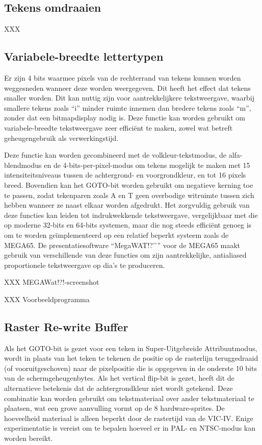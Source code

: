 \subsection{Tekens omdraaien}

XXX

\subsection{Variabele-breedte lettertypen}

Er zijn 4 bits waarmee pixels van de rechterrand van tekens kunnen worden weggesneden wanneer deze worden weergegeven. Dit heeft het effect dat tekens smaller worden. Dit kan nuttig zijn voor aantrekkelijkere tekstweergave, waarbij smallere tekens zoals ``i'' minder ruimte innemen dan bredere tekens zoals ``m'', zonder dat een bitmapdisplay nodig is. Deze functie kan worden gebruikt om variabele-breedte tekstweergave zeer efficiënt te maken, zowel wat betreft geheugengebruik als verwerkingstijd.

Deze functie kan worden gecombineerd met de volkleur-tekstmodus, de alfa-blendmodus en de 4-bits-per-pixel-modus om tekens mogelijk te maken met 15 intensiteitsniveaus tussen de achtergrond- en voorgrondkleur, en tot 16 pixels breed. Bovendien kan het GOTO-bit worden gebruikt om negatieve kerning toe te passen, zodat tekenparen zoals A en T geen overbodige witruimte tussen zich hebben wanneer ze naast elkaar worden afgedrukt. Het zorgvuldig gebruik van deze functies kan leiden tot indrukwekkende tekstweergave, vergelijkbaar met die op moderne 32-bits en 64-bits systemen, maar die nog steeds efficiënt genoeg is om te worden geïmplementeerd op een relatief beperkt systeem zoals de MEGA65. De presentatiesoftware ``MegaWAT!?’’'' voor de MEGA65 maakt gebruik van verschillende van deze functies om zijn aantrekkelijke, antialiased proportionele tekstweergave op dia's te produceren.

XXX MEGAWat!?!-screenshot

XXX Voorbeeldprogramma

\subsection{Raster Re-write Buffer}

Als het GOTO-bit is gezet voor een teken in Super-Uitgebreide Attribuutmodus, wordt in plaats van het teken te tekenen de positie op de rasterlijn teruggedraaid (of vooruitgeschoven) naar de pixelpositie die is opgegeven in de onderste 10 bits van de schermgeheugenbytes. Als het vertical flip-bit is gezet, heeft dit de alternatieve betekenis dat de achtergrondkleur niet wordt getekend. Deze combinatie kan worden gebruikt om tekstmateriaal over ander tekstmateriaal te plaatsen, wat een grove aanvulling vormt op de 8 hardware-sprites. De hoeveelheid materiaal is alleen beperkt door de rastertijd van de VIC-IV. Enige experimentatie is vereist om te bepalen hoeveel er in PAL- en NTSC-modus kan worden bereikt.

